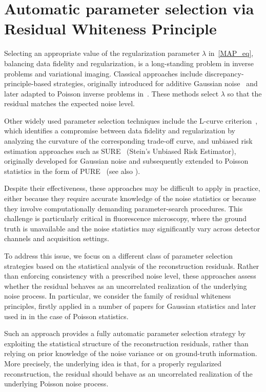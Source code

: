 \documentclass[letterpaper]{article}
\begin{document}
\section{Automatic parameter selection via Residual Whiteness Principle}
\label{secRPW}

Selecting an appropriate value of the regularization parameter $\lambda$ in~\eqref{MAP_eq}, balancing data fidelity and regularization, is a long-standing problem in inverse problems and variational imaging. Classical approaches include discrepancy-principle-based strategies, originally introduced for additive Gaussian noise~\cite{morozov2012methods} and later adapted to Poisson inverse problems in~\cite{Bertero_2010,bevilacqua2021nearly}. These methods select $\lambda$ so that the residual matches the expected noise level.

Other widely used parameter selection techniques include the L-curve criterion~\cite{hansen1992analysis}, which identifies a compromise between data fidelity and regularization by analyzing the curvature of the corresponding trade-off curve, and unbiased risk estimation approaches such as SURE~\cite{Stein1981} (Stein's Unbiased Risk Estimator), originally developed for Gaussian noise and subsequently extended to Poisson statistics in the form of PURE~\cite{PURE} (see also \cite{Massa_2021}).

Despite their effectiveness, these approaches may be difficult to apply in practice, either because they require accurate knowledge of the noise statistics or because they involve computationally demanding parameter-search procedures. This challenge is particularly critical in fluorescence microscopy, where the ground truth is unavailable and the noise statistics may significantly vary across detector channels and acquisition settings.

To address this issue, we focus on a different class of parameter selection strategies based on the statistical analysis of the reconstruction residuals. Rather than enforcing consistency with a prescribed noise level, these approaches assess whether the residual behaves as an uncorrelated realization of the underlying noise process. In particular, we consider the family of residual whiteness principles, firstly applied in a number of papers for Gaussian statistics \cite{Lanza_RWP1,Lanza_RWP2,PragliolaRWP} and later used in \cite{BEVILACQUA2023197,Bevilacqua_2023,bevilacqua2021nearly} in the case of Poisson statistics.

\smallskip

Such an approach provides a fully automatic parameter selection strategy by exploiting the statistical structure of the reconstruction residuals, rather than relying on prior knowledge of the noise variance or on ground-truth information. More precisely, the underlying idea is that, for a properly regularized reconstruction, the residual should behave as an uncorrelated realization of the underlying Poisson noise process. 
\end{document}
